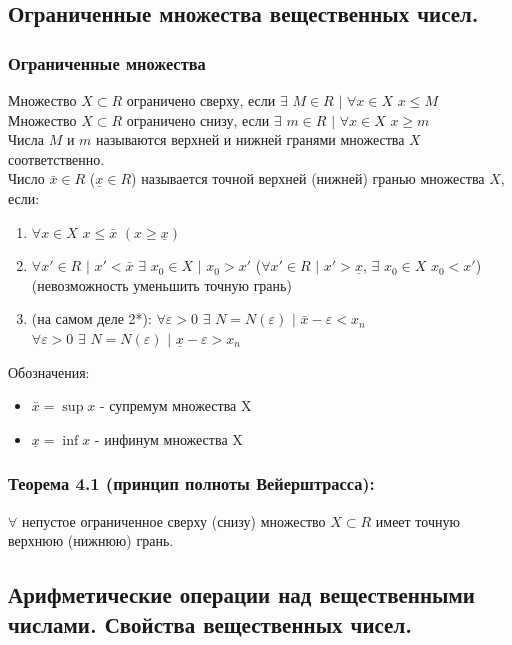 \documentclass[12pt]{article}
\begin{document}
    \subsection{Ограниченные множества вещественных чисел.}
    \subsubsection*{Ограниченные множества}
    \noindent Множество $X \subset R$ ограничено сверху, если $\exists$ $M \in R$ $|$ $\forall x \in X$ $x \le M$\\
    Множество $X \subset R$ ограничено снизу, если $\exists$ $m \in R$ $|$ $\forall x \in X$ $x \ge m$\\
    Числа $M$ и $m$ называются верхней и нижней гранями множества $X$ соответственно.\\
    Число $\bar{x} \in R$ ($\underline{x} \in R$) называется точной верхней (нижней) гранью множества $X$, если:
    \begin{enumerate}
        \item $\forall x \in X$ $x \le \bar{x}$ $(x \ge \underline{x})$
        \item $\forall x' \in R$ $|$ $x' < \bar{x}$ $\exists$ $x_{0} \in X$ $|$ $x_{0} > x'$ ($\forall x' \in R$ $|$ $x' > \underline{x}$, $\exists$ $x_{0} \in X$ $x_{0} < x'$) (невозможность уменьшить точную грань)
        \item (на самом деле 2*): $\forall \varepsilon > 0$ $\exists$ $N = N(\varepsilon)$ $|$ $\bar{x} - \varepsilon < x_n$\\
        $\forall \varepsilon > 0$ $\exists$ $N = N(\varepsilon)$ $|$ $\underline{x} - \varepsilon > x_n$
    \end{enumerate} 
    Обозначения:
    \begin{itemize}
        \item $\bar{x} = \sup x$ - супремум множества X
        \item $\underline{x} = \inf x$ - инфинум множества X
    \end{itemize}
    \subsubsection*{Теорема 4.1 (принцип полноты Вейерштрасса):}
    $\forall$ непустое ограниченное сверху (снизу) множество $X \subset R$ имеет точную верхнюю (нижнюю) грань.

    \subsection{Арифметические операции над вещественными числами. Свойства вещественных чисел.}
\end{document}
